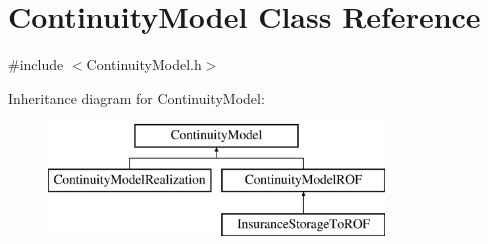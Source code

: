 \hypertarget{classContinuityModel}{}\section{Continuity\+Model Class Reference}
\label{classContinuityModel}


{\ttfamily \#include $<$Continuity\+Model.\+h$>$}

Inheritance diagram for Continuity\+Model\+:\begin{figure}[H]
\begin{center}
\leavevmode
\includegraphics[height=3.000000cm]{classContinuityModel}
\end{center}
\end{figure}
